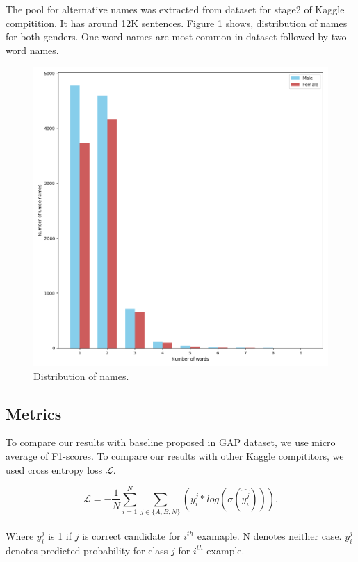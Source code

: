 \documentclass[11pt,a4paper]{article}
\begin{document}
  
The pool for alternative names was extracted from dataset for stage2 of Kaggle compitition. It has around 12K sentences. Figure \ref{fig:augment_dist} shows, distribution of names for both genders. One word names are most common in dataset followed by two word names.

\begin{figure}
  \centering
  \includegraphics[width=.5\textwidth]{augment_dist.png}
  \caption{Distribution of names.}
  \label{fig:augment_dist}
\end{figure}

\subsection{Metrics}
To compare our results with baseline proposed in GAP dataset, we use micro average of F1-scores. To compare our results with other Kaggle compititors, we used cross entropy loss $\mathcal{L}$.

\[
  \mathcal{L} = - \frac{1}{N} \sum_{i=1}^N \sum_{j \in \{A, B, N\}} (y_i^j* log(\sigma(\hat{y_i^j}))).
\]

Where $y_i^j$ is 1 if $j$ is correct candidate for $i^{th}$ examaple. N denotes neither case. $\hat{y_i^j}$ denotes predicted probability for class $j$ for $i^{th}$ example.
\end{document}
